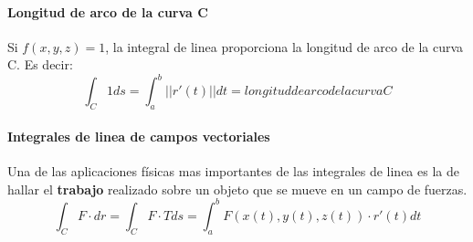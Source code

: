\documentclass[11pt]{article}
\begin{document}
\paragraph{Longitud de arco de la curva C}
Si $f(x,y,z) = 1$, la integral de linea proporciona la longitud de arco de la curva C. Es decir:
\begin{equation*}
	\int_C 1 ds = \int_a^b ||r'(t)||dt = longitud de arco de la curva C
\end{equation*}
\paragraph{Integrales  de linea de campos vectoriales}
Una de las aplicaciones físicas mas importantes de las integrales de linea es la de hallar el \textbf{trabajo} realizado sobre un objeto que se mueve en un campo de fuerzas.
\begin{equation*}
	\int_C F \cdot dr = \int_C F \cdot T ds = \int_a^b F(x(t), y(t), z(t)) \cdot r'(t)dt
\end{equation*}
\end{document}
